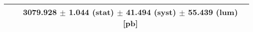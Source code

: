 \begin{tabular}{lc}
\hline
                               & 3079.928 $\pm$ 1.044 (stat) $\pm$ 41.494 (syst) $\pm$ 55.439 (lum) [pb]  \\
\hline
\end{tabular}
